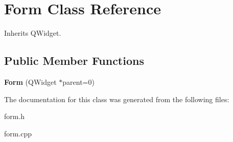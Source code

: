 \hypertarget{class_form}{}\section{Form Class Reference}
\label{class_form}


Inherits Q\+Widget.

\subsection*{Public Member Functions}
\begin{DoxyCompactItemize}
\item 
\hypertarget{class_form_a9a921e26a02f23bffdea4330d6795796}{}{\bfseries Form} (Q\+Widget $\ast$parent=0)\label{class_form_a9a921e26a02f23bffdea4330d6795796}

\end{DoxyCompactItemize}


The documentation for this class was generated from the following files\+:\begin{DoxyCompactItemize}
\item 
form.\+h\item 
form.\+cpp\end{DoxyCompactItemize}
